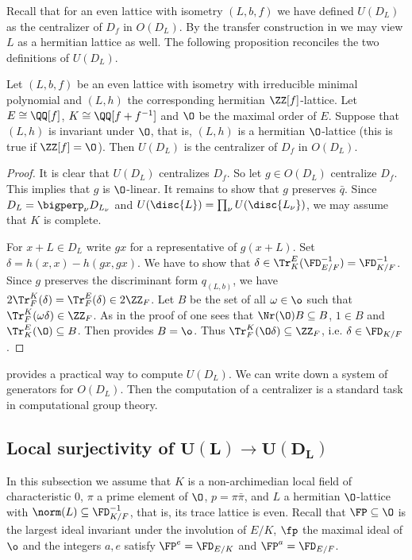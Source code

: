 Recall that for an even lattice with isometry $(L,b,f)$ we have defined $U(D_L)$ as the centralizer of $D_f$ in $O(D_L)$. By the transfer construction in  we may view $L$ as a hermitian lattice as well.
The following proposition reconciles the two definitions of $U(D_L)$.

\begin{proposition}\label{UDLtransfer}
  Let $(L,b,f)$ be an even lattice with isometry with irreducible minimal polynomial and $(L,h)$ the corresponding hermitian $\ZZ[f]$-lattice.
  Let $E \cong \QQ[f]$, $K\cong \QQ[f+f^{-1}]$ and $\O$ be the maximal order of $E$. Suppose that $(L,h)$ is invariant under $\O$, that is, $(L, h)$ is a hermitian $\O$-lattice (this is true if $\ZZ[f] = \O$).
 Then $U(D_L)$ is the centralizer of $D_f$ in $O(D_L)$.
\end{proposition}

\begin{proof}
It is clear that $U(D_L)$ centralizes $D_f$. So let $g \in O(D_L)$ centralize $D_f$. This implies that $g$ is $\O$-linear.
It remains to show that $g$ preserves $\bar q$.
Since $D_L = \bigperp_{\nu} D_{L_\nu}$ and $U(\disc{L})=\prod_{\nu}U(\disc{L_\nu})$, we may assume that $K$ is complete.

For $x + L \in D_L$ write $gx$ for a representative of $g(x+L)$.
  Set $\delta = h(x,x)-h(gx,gx)$. We have to show that $\delta \in \Tr^E_K({\FD_{E/F}^{-1}})=\FD_{K/F}^{-1}$.
Since $g$ preserves the discriminant form $q_{(L,b)}$, we have
$2\Tr^K_F(\delta)=\Tr^E_F(\delta) \in  2 \ZZ_F$.
Let $B$ be the set of all $\omega \in \o$ such that $ \Tr^K_F(\omega \delta) \in   \ZZ_F$. As in the proof of  one sees that $\Nr(\O) B \subseteq B$, $1 \in B$ and $\Tr^E_K(\O) \subseteq B$. Then  provides $B = \o$.
Thus $\Tr^K_F(\O \delta) \subseteq \ZZ_F$, i.e. $\delta \in {\FD_{K/F}}$.
\end{proof}

\begin{remark}
  provides a practical way to compute $U(D_L)$. We can write down a system of generators for $O(D_L)$. Then
 the computation of a centralizer is a standard task in computational group theory.
\end{remark}

\subsection{Local surjectivity of $\mathbf{U(L) \to U(D_L)}$}\label{subsec:localsurjectivity}
In this subsection we assume that $K$ is a non-archimedian local field of characteristic $0$, $\pi$ a prime element of $\O$, $p = \pi \bar \pi$,
and $L$ a hermitian $\O$-lattice with $\norm(L)\subseteq \FD_{K/F}^{-1}$, that is, its trace lattice is even.
Recall that $\FP\subseteq \O$ is the largest ideal invariant under the involution of $E/K$, $\fp$ the maximal ideal of $\o$ and the integers $a, e$ satisfy $\FP^e = \FD_{E/K}$ and $\FP^a = \FD_{E/F}$.

